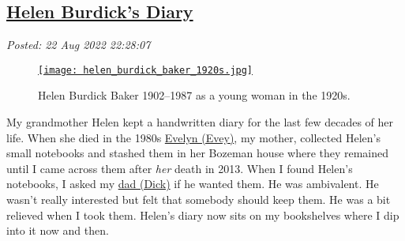 %

\subsection*{\href{http://analyzethedatanotthedrivel.org/2022/08/22/helen-burdicks-diary/}{Helen Burdick's Diary}}

\noindent\emph{Posted: 22 Aug 2022 22:28:07}
\vspace{6pt}

\captionsetup[figure]{labelformat=empty}
\begin{SCfigure}
\centering
\href{https://conceptcontrol.smugmug.com/People/Grandparents-1/i-nBLh69S/A}{\texttt{[image: helen\_burdick\_baker\_1920s.jpg]}}
\caption[Helen Burdick Baker 1902--1987]{Helen Burdick Baker 1902--1987 as a young woman in the 1920s.}
\label{fig:7491x0}
\end{SCfigure}
 


My grandmother Helen kept a handwritten diary for the last few decades
of her life. When she died in the 1980s \href{https://conceptcontrol.smugmug.com/People/The-Way-We-Were/i-HwPZXV9/A}{Evelyn (Evey)}, my mother,
collected Helen's small notebooks and stashed them in her Bozeman house
where they remained until I came across them after \emph{her} death in
2013. When I found Helen's notebooks, I asked my \href{https://conceptcontrol.smugmug.com/People/The-Way-We-Were/i-zKPBhVk/A}{dad (Dick)} if he wanted
them. He was ambivalent. He wasn't really interested but felt that
somebody should keep them. He was a bit relieved when I took them.
Helen's diary now sits on my bookshelves where I dip into it now and
then.


